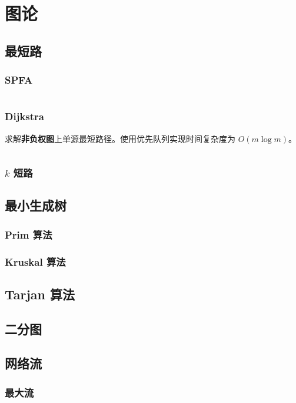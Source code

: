 \documentclass[a4paper, twoside]{article}
\begin{document}
\newpage
\section{图论}
\subsection{最短路}
    \subsubsection{SPFA}
    \inputminted{cpp}{../src/图论/SPFA.cpp}

    \subsubsection{Dijkstra}
    求解\textbf{非负权图}上单源最短路径。使用优先队列实现时间复杂度为 $O(m \log m)$。
    \inputminted{cpp}{../src/图论/Dijkstra.cpp}

    \subsubsection{$k$ 短路}

\subsection{最小生成树}
    \subsubsection{Prim 算法}

    \subsubsection{Kruskal 算法}

\subsection{Tarjan 算法}

\subsection{二分图}

\subsection{网络流}
    \subsubsection{最大流}
\end{document}
